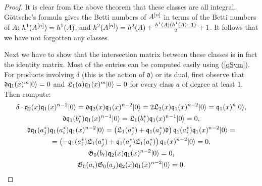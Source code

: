 \begin{proof} It is clear from the above theorem that these classes are all integral.
G\"ottsche's formula \cite[p.~35]{Gottsche} gives the Betti numbers of $A^{[n]}$ in terms of the Betti numbers of $A$: 
$h^1(A^{[n]}) = h^1(A)$, and $h^2(A^{[n]}) = h^2(A)+ \frac{h^1(A)(h^1(A)-1)}{2} + 1$. It follows that we have not forgotten any classes. 

Next we have to show that the intersection matrix between these classes is in fact the identity matrix. Most of the entries can be computed easily using (\ref{qSym}). For products involving $\delta$ (this is the action of $\mathfrak{d}$) or its dual, first observe that $\mathfrak{d}\mathfrak{q}_1(x)^m|0\rangle = 0 $ and $ \mathfrak{L}_1(a)\mathfrak{q}_1(x)^m|0\rangle =0$ for every class $a$ of degree at least 1. Then compute:
\begin{gather*}
\delta \cdot\mathfrak{q}_2(x)\mathfrak{q}_{1}(x)^{n-2} |0\rangle = \mathfrak{d}\mathfrak{q}_2(x)\mathfrak{q}_{1}(x)^{n-2} |0\rangle = 2 \mathfrak{L}_2(x) \mathfrak{q}_{1}(x)^{n-2} |0\rangle = \mathfrak{q}_{1}(x)^{n}|0\rangle,
\\
\mathfrak{d}\mathfrak{q}_{1}(b_{i}^*)\mathfrak{q}_{1}(x)^{n-1}|0\rangle =  \mathfrak{L}_1(b_i^*) \mathfrak{q}_{1}(x)^{n-1} |0\rangle = 0,
\\
\mathfrak{d}\mathfrak{q}_{1}(a_{j}^*)\mathfrak{q}_{1}(a_{i}^*)\mathfrak{q}_{1}(x)^{n-2}|0\rangle = \left(\mathfrak{L}_1(a_j^*) +\mathfrak{q}_{1}(a_{j}^*)\mathfrak{d}\right)\mathfrak{q}_{1}(a_{i}^*)\mathfrak{q}_{1}(x)^{n-2}|0\rangle = 
  \\ =\left(-\mathfrak{q}_1(a_i^*)\mathfrak{L}_1(a_j^*) + \mathfrak{q}_{1}(a_{j}^*)\mathfrak{L}_1(a_i^*)\right)\mathfrak{q}_{1}(x)^{n-2}|0\rangle  = 0,
\\
\mathfrak{G}_0(b_i)\mathfrak{q}_2(x)\mathfrak{q}_{1}(x)^{n-2} |0\rangle = 0, 
\\
\mathfrak{G}_0(a_i)\mathfrak{G}_0(a_j)\mathfrak{q}_2(x)\mathfrak{q}_{1}(x)^{n-2} |0\rangle = 0.
\end{gather*}
\end{proof}


